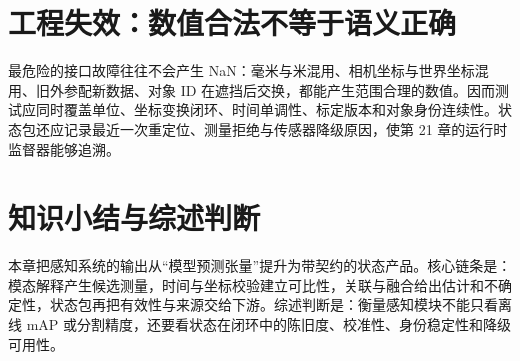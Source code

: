\section{工程失效：数值合法不等于语义正确}

最危险的接口故障往往不会产生 NaN：毫米与米混用、相机坐标与世界坐标混用、旧外参配新数据、对象 ID 在遮挡后交换，都能产生范围合理的数值。因而测试应同时覆盖单位、坐标变换闭环、时间单调性、标定版本和对象身份连续性。状态包还应记录最近一次重定位、测量拒绝与传感器降级原因，使第 21 章的运行时监督器能够追溯。

\section{知识小结与综述判断}

本章把感知系统的输出从“模型预测张量”提升为带契约的状态产品。核心链条是：模态解释产生候选测量，时间与坐标校验建立可比性，关联与融合给出估计和不确定性，状态包再把有效性与来源交给下游。综述判断是：衡量感知模块不能只看离线 mAP 或分割精度，还要看状态在闭环中的陈旧度、校准性、身份稳定性和降级可用性。


